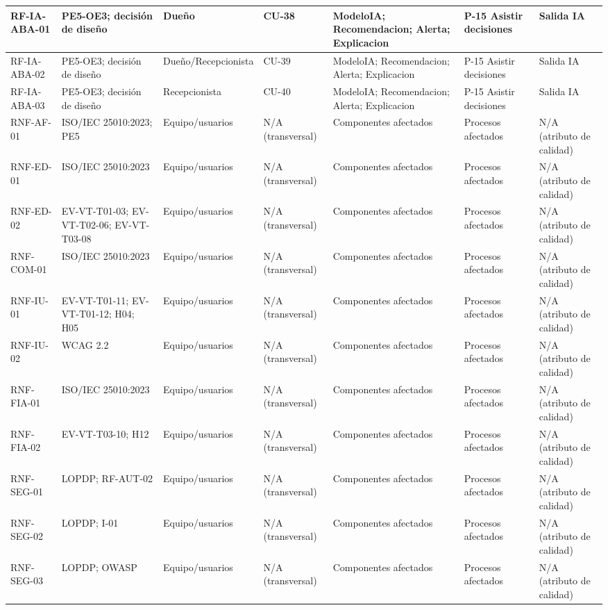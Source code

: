 \begin{landscape}
\begin{longtable}{|p{1.8cm}|p{3.4cm}|p{2.0cm}|p{1.4cm}|p{5.0cm}|p{4.0cm}|p{3.2cm}|}
RF-IA-ABA-01 & PE5-OE3; decisión de diseño & Dueño & CU-38 & ModeloIA; Recomendacion; Alerta; Explicacion & P-15 Asistir decisiones & Salida IA \\ \hline
RF-IA-ABA-02 & PE5-OE3; decisión de diseño & Dueño/Recepcionista & CU-39 & ModeloIA; Recomendacion; Alerta; Explicacion & P-15 Asistir decisiones & Salida IA \\ \hline
RF-IA-ABA-03 & PE5-OE3; decisión de diseño & Recepcionista & CU-40 & ModeloIA; Recomendacion; Alerta; Explicacion & P-15 Asistir decisiones & Salida IA \\ \hline
RNF-AF-01 & ISO/IEC 25010:2023; PE5 & Equipo/usuarios & N/A (transversal) & Componentes afectados & Procesos afectados & N/A (atributo de calidad) \\ \hline
RNF-ED-01 & ISO/IEC 25010:2023 & Equipo/usuarios & N/A (transversal) & Componentes afectados & Procesos afectados & N/A (atributo de calidad) \\ \hline
RNF-ED-02 & EV-VT-T01-03; EV-VT-T02-06; EV-VT-T03-08 & Equipo/usuarios & N/A (transversal) & Componentes afectados & Procesos afectados & N/A (atributo de calidad) \\ \hline
RNF-COM-01 & ISO/IEC 25010:2023 & Equipo/usuarios & N/A (transversal) & Componentes afectados & Procesos afectados & N/A (atributo de calidad) \\ \hline
RNF-IU-01 & EV-VT-T01-11; EV-VT-T01-12; H04; H05 & Equipo/usuarios & N/A (transversal) & Componentes afectados & Procesos afectados & N/A (atributo de calidad) \\ \hline
RNF-IU-02 & WCAG 2.2 & Equipo/usuarios & N/A (transversal) & Componentes afectados & Procesos afectados & N/A (atributo de calidad) \\ \hline
RNF-FIA-01 & ISO/IEC 25010:2023 & Equipo/usuarios & N/A (transversal) & Componentes afectados & Procesos afectados & N/A (atributo de calidad) \\ \hline
RNF-FIA-02 & EV-VT-T03-10; H12 & Equipo/usuarios & N/A (transversal) & Componentes afectados & Procesos afectados & N/A (atributo de calidad) \\ \hline
RNF-SEG-01 & LOPDP; RF-AUT-02 & Equipo/usuarios & N/A (transversal) & Componentes afectados & Procesos afectados & N/A (atributo de calidad) \\ \hline
RNF-SEG-02 & LOPDP; I-01 & Equipo/usuarios & N/A (transversal) & Componentes afectados & Procesos afectados & N/A (atributo de calidad) \\ \hline
RNF-SEG-03 & LOPDP; OWASP & Equipo/usuarios & N/A (transversal) & Componentes afectados & Procesos afectados & N/A (atributo de calidad) \\ \hline

\end{longtable}
\end{landscape}
